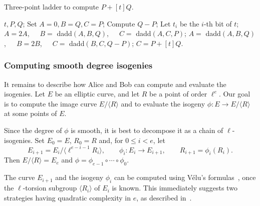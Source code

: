 \documentclass[jmc]{degruyter-journal-a}
\theoremstyle{definition}
\newcommand{\cyc}[1]{{\langle #1 \rangle}}
\begin{document}
\begin{algorithm}[t]
  \caption{Three-point ladder to compute $P+[t]Q$.}
  \label{fig:ladder}
  \begin{algorithmic}[1]
    \REQUIRE $t,P,Q$;
    \STATE Set $A=0,B=Q,C=P$;
    \STATE Compute $Q-P$;
    \STATE Let $t_i$ be the $i$-th bit of $t$;
    \STATE $A=2A$,~~~$B=$ dadd$(A,B,Q)$,~~~$C=$ dadd$(A,C,P)$;
    \ELSE
    \STATE $A=$ dadd$(A,B,Q)$,~~~$B=2B$,~~~$C=$ dadd$(B,C,Q-P)$;
    \ENDIF
    \ENDFOR
    \ENSURE $C=P+[t]Q$.
  \end{algorithmic}
\end{algorithm}


\subsubsection{Computing smooth degree isogenies}\label{sssec:isogeny}


It remains to describe how Alice and Bob can compute and evaluate the
isogenies. Let $E$ be an elliptic curve, and let $R$ be a point of
order $\ell^e$. Our goal is to compute the image curve $E/\cyc{R}$ and
to evaluate the isogeny $\phi:E\to E/\cyc{R}$ at some points of $E$.

Since the degree of $\phi$ is smooth, it is best to decompose it as a
chain of $\ell$-isogenies. Set $E_0=E$, $R_0=R$ and, for $0\le i <e$,
let
\begin{equation*}
  E_{i+1} = E_i/\cyc{\ell^{e-i-1}R_i},\qquad
  \phi_i : E_i \to E_{i+1},\qquad
  R_{i+1} = \phi_i(R_i).
\end{equation*}
Then $E/\cyc{R} = E_e$ and $\phi=\phi_{e-1}\circ\cdots\circ\phi_0$.

The curve $E_{i+1}$ and the isogeny $\phi_i$ can be computed using
V\'elu's formulas~\cite{Velu}, once the $\ell$-torsion
subgroup $\cyc{R_i}$ of $E_i$ is known. This immediately suggests two strategies
having quadratic complexity in $e$, as described
in~\cite{pqcrypto}.
\end{document}
